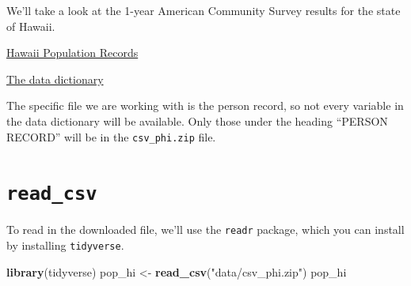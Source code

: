 \documentclass[]{book}
\newenvironment{Shaded}{\begin{snugshade}}{\end{snugshade}}
\newcommand{\KeywordTok}[1]{\textcolor[rgb]{0.13,0.29,0.53}{\textbf{{#1}}}}
\newcommand{\StringTok}[1]{\textcolor[rgb]{0.31,0.60,0.02}{{#1}}}
\newcommand{\NormalTok}[1]{{#1}}
\theoremstyle{definition}
\theoremstyle{definition}
\theoremstyle{remark}
\begin{document}
We'll take a look at the 1-year American Community Survey results for
the state of Hawaii.

\href{https://www2.census.gov/programs-surveys/acs/data/pums/2015/1-Year/csv_phi.zip}{Hawaii
Population Records}

\href{https://www2.census.gov/programs-surveys/acs/tech_docs/pums/data_dict/PUMSDataDict15.txt}{The
data dictionary}

The specific file we are working with is the person record, so not every
variable in the data dictionary will be available. Only those under the
heading ``PERSON RECORD'' will be in the \texttt{csv\_phi.zip} file.

\section{\texorpdfstring{\texttt{read\_csv}}{read\_csv}}\label{read_csv}

To read in the downloaded file, we'll use the \texttt{readr} package,
which you can install by installing \texttt{tidyverse}.

\begin{Shaded}
\begin{Highlighting}[]
\KeywordTok{library}\NormalTok{(tidyverse)}
\NormalTok{pop_hi <-}\StringTok{ }\KeywordTok{read_csv}\NormalTok{(}\StringTok{"data/csv_phi.zip"}\NormalTok{)}
\NormalTok{pop_hi}
\end{Highlighting}
\end{Shaded}
\end{document}

